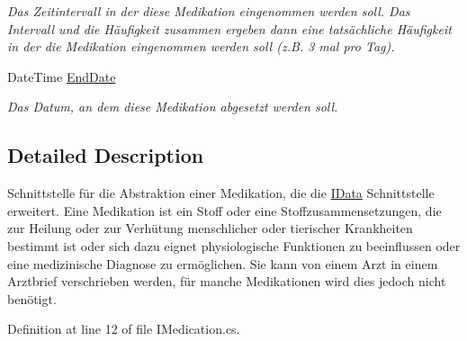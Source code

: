 \begin{CompactItemize}
\begin{CompactList}\small\item\em Das Zeitintervall in der diese Medikation eingenommen werden soll. Das Intervall und die H\"{a}ufigkeit zusammen ergeben dann eine tats\"{a}chliche H\"{a}ufigkeit in der die Medikation eingenommen werden soll (z.B. 3 mal pro Tag). \item\end{CompactList}\item 
\hypertarget{interfacemy_m_d_1_1_model_interface_1_1_data_model_interface_1_1_i_medication_a7f44c44b37e090a40ad2d76aa86d08d}{
Date\-Time \hyperlink{interfacemy_m_d_1_1_model_interface_1_1_data_model_interface_1_1_i_medication_a7f44c44b37e090a40ad2d76aa86d08d}{End\-Date}}
\label{d2/dce/interfacemy_m_d_1_1_model_interface_1_1_data_model_interface_1_1_i_medication_a7f44c44b37e090a40ad2d76aa86d08d}

\begin{CompactList}\small\item\em Das Datum, an dem diese Medikation abgesetzt werden soll. \item\end{CompactList}\end{CompactItemize}


\subsection{Detailed Description}
Schnittstelle f\"{u}r die Abstraktion einer Medikation, die die \hyperlink{interfacemy_m_d_1_1_model_interface_1_1_data_model_interface_1_1_i_data}{IData} Schnittstelle erweitert. Eine Medikation ist ein Stoff oder eine Stoffzusammensetzungen, die zur Heilung oder zur Verh\"{u}tung menschlicher oder tierischer Krankheiten bestimmt ist oder sich dazu eignet physiologische Funktionen zu beeinflussen oder eine medizinische Diagnose zu erm\"{o}glichen. Sie kann von einem Arzt in einem Arztbrief verschrieben werden, f\"{u}r manche Medikationen wird dies jedoch nicht ben\"{o}tigt. 



Definition at line 12 of file IMedication.cs.

